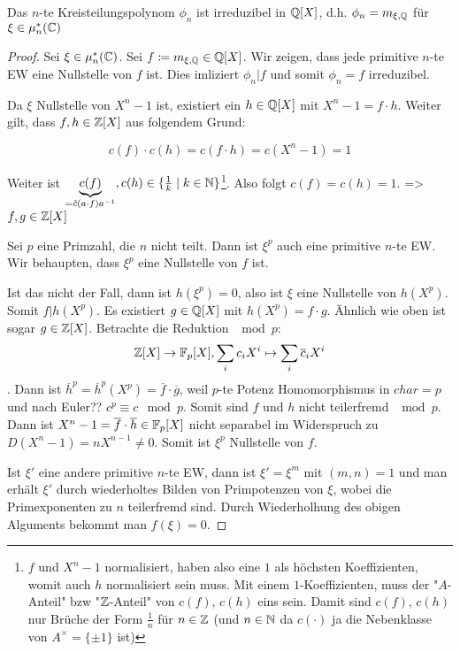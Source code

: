 \documentclass[../main.tex]{subfiles}
\begin{document}
\begin{theorem}\label{theo:3.14}
    Das $n$-te Kreisteilungspolynom $\phi_n$ ist irreduzibel in $\mathbb{Q}[X]$, d.h.
    $\phi_n=m_{\xi,\mathbb{Q}}$ für $\xi\in \mu_n^*(\mathbb{C})$
\end{theorem}
\begin{proof}
    Sei $\xi \in \mu_n^*(\mathbb{C})$. Sei $f\coloneqq m_{\xi,\mathbb{Q}} \in \mathbb{Q}[X]$.
    Wir zeigen, dass jede primitive $n$-te EW eine Nullstelle von $f$ ist.
    Dies imliziert $\phi_n |f$ und somit $\phi_n =f$ irreduzibel.
    
    Da $\xi$ Nullstelle von $X^n-1$ ist, existiert ein $h\in\mathbb{Q}[X]$ mit $X^n-1=f\cdot h$.
    Weiter gilt, dass $f,h\in \mathbb{Z}[X]$ aus folgendem Grund:
    \begin{reminder*}
        $$c(f)\cdot c(h) = c(f\cdot h) = c(X^n-1) = 1$$
        
    \end{reminder*}
    Weiter ist $\underbrace{c(f)}_{ =\Tilde{c}(a\cdot f) a^{-1}},c(h)\in \{\frac{1}{k}\mid k\in \mathbb{N}\}$\footnote{$f$ und $X^n-1$ normalisiert, haben also eine $1$ als höchsten Koeffizienten, womit auch $h$ normalisiert sein muss. Mit einem $1$-Koeffizienten, muss der "$A$-Anteil" bzw "$\mathbb{Z}$-Anteil" von $c(f)$, $c(h)$ eins sein. Damit sind $c(f)$, $c(h)$ nur Brüche der Form $\frac{1}{n}$ für $n\in \mathbb{Z}$ (und $n\in \mathbb{N}$ da $c(\cdot)$ ja die Nebenklasse von $A^\times = \{\pm 1\}$ ist)}.
    Also folgt $c(f) = c(h)=1$. => $f,g\in \mathbb{Z}[X]$

    Sei $p$ eine Primzahl, die $n$ nicht teilt.
    Dann ist $\xi^p$ auch eine primitive $n$-te EW.
    Wir behaupten, dass $\xi^p$ eine Nullstelle von $f$ ist.

    Ist das nicht der Fall, dann ist $h(\xi^p)=0$, also ist $\xi$ eine Nullstelle von $h(X^p)$.
    Somit $f|h(X^p)$. Es existiert $g\in \mathbb{Q}[X]$ mit $h(X^p) = f\cdot g$.
    Ähnlich wie oben ist sogar $g\in \mathbb{Z}[X]$.
    Betrachte die Reduktion $\mod p$:
    $$\mathbb{Z}[X] \rightarrow \mathbb{F}_p[X], \sum_i c_i X^i \mapsto \sum_i \overline{c}_i X^i$$.
    Dann ist $\overline{h}^p = \overline{h}^p(X^p)= \overline{f}\cdot \overline{g}$, weil $p$-te Potenz Homomorphismus in $char=p$ und nach Euler?? $c^p\equiv c \mod p$.
    Somit sind $f$ und $h$ nicht teilerfremd $\mod p$.
    Dann ist $X^n-1 = \overline{f}\cdot\overline{h}\in \mathbb{F}_p[X]$ nicht separabel im Widerspruch zu $D(X^n-1) = nX^{n-1} \neq 0$.
    Somit ist $\xi^p$ Nullstelle von $f$.

    Ist $\xi'$ eine andere primitive $n$-te EW, dann ist $\xi' = \xi^m$ mit $(m,n)=1$ und man erhält $\xi'$ durch wiederholtes Bilden von Primpotenzen von $\xi$, wobei die Primexponenten zu $n$ teilerfremd sind.
    Durch Wiederholhung des obigen Alguments bekommt man $f(\xi)=0$.
\end{proof}
\end{document}
